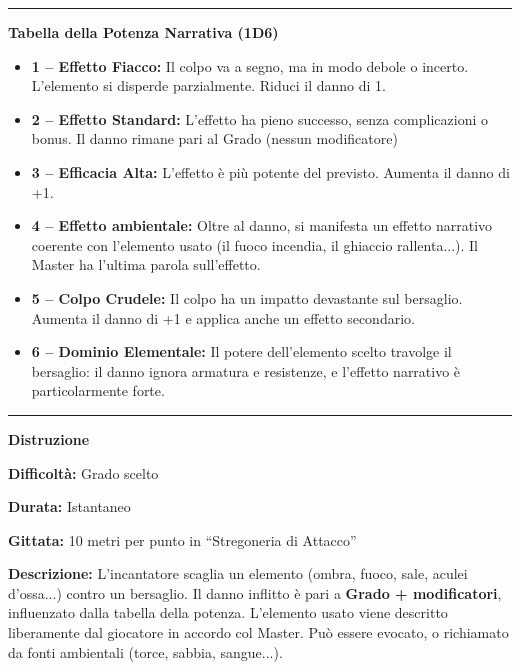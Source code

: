 \documentclass[./magie.tex]{subfiles}
\begin{document}
\vspace{0.2cm}
\noindent
\begin{center}
\rule{\textwidth}{0.4pt} 
\end{center}
\vspace{0.2cm}
\clearpage
{\zarafirtitlefont\Large\bfseries\noindent Tabella della Potenza Narrativa (1D6)}
\begin{itemize}
\item \textbf{1 – Effetto Fiacco:} Il colpo va a segno, ma in modo debole o incerto. L’elemento si disperde parzialmente. Riduci il danno di 1.
\item \textbf{2 – Effetto Standard:} L’effetto ha pieno successo, senza complicazioni o bonus. Il danno rimane pari al Grado (nessun modificatore)
\item \textbf{3 – Efficacia Alta:} L’effetto è più potente del previsto. Aumenta il danno di +1.
\item \textbf{4 – Effetto ambientale:} Oltre al danno, si manifesta un effetto narrativo coerente con l’elemento usato (il fuoco incendia, il ghiaccio rallenta...). Il Master ha l’ultima parola sull’effetto.
\item \textbf{5 – Colpo Crudele:} Il colpo ha un impatto devastante sul bersaglio. Aumenta il danno di +1 e applica anche un effetto secondario.
\item \textbf{6 – Dominio Elementale:} Il potere dell’elemento scelto travolge il bersaglio: il danno ignora armatura e resistenze, e l’effetto narrativo è particolarmente forte.
\end{itemize}


\vspace{0.2cm}
\noindent
\begin{center}
\rule{\textwidth}{0.4pt} 
\end{center}
\vspace{0.2cm}

{\zarafirtitlefont\Large\bfseries\noindent Distruzione}\\
\begin{description}
\item \textbf{Difficoltà:} Grado scelto
\item \textbf{Durata:} Istantaneo
\item \textbf{Gittata:} 10 metri per punto in “Stregoneria di Attacco”
\item \textbf{Descrizione:} L’incantatore scaglia un elemento (ombra, fuoco, sale, aculei d’ossa...) contro un bersaglio. Il danno inflitto è pari a \textbf{Grado + modificatori}, influenzato dalla tabella della potenza. L’elemento usato viene descritto liberamente dal giocatore in accordo col Master. Può essere evocato, o richiamato da fonti ambientali (torce, sabbia, sangue...).
\end{description}
\end{document}
